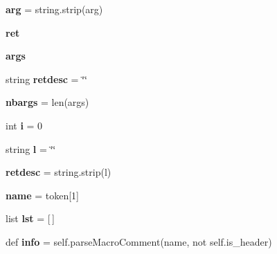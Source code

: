 \begin{DoxyCompactItemize}
{\bfseries arg} = string.\+strip(arg)
\item 
\mbox{\label{classapibuild_1_1_c_parser_a35c8a81ddf3575475cae4276af4a69ee}} 
{\bfseries ret}
\item 
\mbox{\label{classapibuild_1_1_c_parser_a476336d8af419c33fcfae56a72a4c0ef}} 
{\bfseries args}
\item 
\mbox{\label{classapibuild_1_1_c_parser_a7495a9d96efc19717517502d120f5e89}} 
string {\bfseries retdesc} = \char`\"{}\char`\"{}
\item 
\mbox{\label{classapibuild_1_1_c_parser_a4b7bea25bc540b64cce172f5cf00eb64}} 
{\bfseries nbargs} = len(args)
\item 
\mbox{\label{classapibuild_1_1_c_parser_ab65f756d8a574b9358cb87bf322cc09f}} 
int {\bfseries i} = 0
\item 
\mbox{\label{classapibuild_1_1_c_parser_a9810eaf8047c5e15636359f891b65328}} 
string {\bfseries l} = \char`\"{}\char`\"{}
\item 
\mbox{\label{classapibuild_1_1_c_parser_a4964887cd4c01159021121a12d6df807}} 
{\bfseries retdesc} = string.\+strip(l)
\item 
\mbox{\label{classapibuild_1_1_c_parser_a74899b04c4ea2dfd9487587a9706f0c0}} 
{\bfseries name} = token\mbox{[}1\mbox{]}
\item 
\mbox{\label{classapibuild_1_1_c_parser_a9cb38b25adc58bf3ce90429f965459ed}} 
list {\bfseries lst} = \mbox{[}$\,$\mbox{]}
\item 
\mbox{\label{classapibuild_1_1_c_parser_ac050695ac00a9e64ef17250429c63235}} 
def {\bfseries info} = self.\+parse\+Macro\+Comment(name, not self.\+is\+\_\+header)
\item 
\mbox{\label{classapibuild_1_1_c_parser_a7012d3e04492d9ce890f8b7dc91c886f}} 

\end{DoxyCompactItemize}
